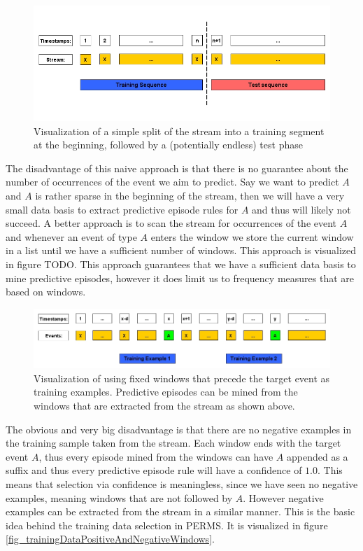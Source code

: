 \begin{figure}[h]
	\centering
  	\includegraphics[width=\textwidth]{trainingDataNaive}
	\caption{Visualization of a simple split of the stream into a training segment at the beginning, followed by a (potentially endless) test phase}
	\label{fig_trainingDataNaive}
\end{figure}

The disadvantage of this naive approach is that there is no guarantee about the number of occurrences of the event we aim to predict. Say we want to predict $A$ and $A$ is rather sparse in the beginning of the stream, then we will have a very small data basis to extract predictive episode rules for $A$ and thus will likely not succeed. 
A better approach is to scan the stream for occurrences of the event $A$ and whenever an event of type $A$ enters the window we store the current window in a list until we have a sufficient number of windows. This approach is visualized in figure TODO. This approach guarantees that we have a sufficient data basis to mine predictive episodes, however it does limit us to frequency measures that are based on windows. 

\begin{figure}[h]
	\centering
  	\includegraphics[width=\textwidth]{trainingDataWindowsOfA}
	\caption{Visualization of using fixed windows that precede the target event as training examples. Predictive episodes can be mined from the windows that are extracted from the stream as shown above.}
	\label{fig_trainingDataNaive}
\end{figure}

The obvious and very big disadvantage is that there are no negative examples in the training sample taken from the stream. Each window ends with the target event $A$, thus every episode mined from the windows can have $A$ appended as a suffix and thus every predictive episode rule will have a confidence of $1.0$. This means that selection via confidence is meaningless, since we have seen no negative examples, meaning windows that are not followed by $A$. However negative examples can be extracted from the stream in a similar manner. This is the basic idea behind the training data selection in PERMS. It is visualized in figure \ref{fig_trainingDataPositiveAndNegativeWindows}. 

